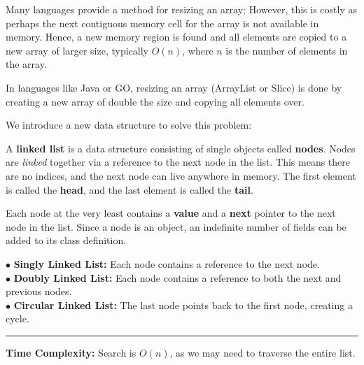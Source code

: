 \begin{Def}

    \label{def:resizing_array}

    Many languages provide a method for resizing an array; However, this is costly as perhaps the next contiguous memory cell 
    for the array is not available in memory. Hence, a new memory region is found and all elements are copied to a new array 
    of larger size, typically $O(n)$, where $n$ is the number of elements in the array.
\end{Def}

\begin{Tip}
    In languages like Java or GO, resizing an array (ArrayList or Slice) is done by creating a new array of double the size and copying all elements over.
\end{Tip}

\newpage 

\noindent
We introduce a new data structure to solve this problem:
\begin{Def}

    A \textbf{linked list} is a data structure consisting of single objects called \textbf{nodes}. Nodes are \emph{linked} together
    via a reference to the next node in the list. This means there are no indices, and the next node can live anywhere
    in memory. The first element is called the \textbf{head}, and the last element is called the \textbf{tail}.
    
    Each node at the very least contains a \textbf{value} and a \textbf{next} pointer to the next node in the list.
    Since a node is an object, an indefinite number of fields can be added to its class definition.
\end{Def}

\begin{Def}

  
        $\bullet$ \textbf{Singly Linked List:} Each node contains a reference to the next node.\\
        $\bullet$ \textbf{Doubly Linked List:} Each node contains a reference to both the next and previous nodes.\\
        $\bullet$ \textbf{Circular Linked List:} The last node points back to the first node, creating a cycle.

    \noindent
    \rule{\textwidth}{0.4pt}
    \noindent
    \textbf{Time Complexity:} Search is $O(n)$, as we may need to traverse the entire list.
\end{Def}

